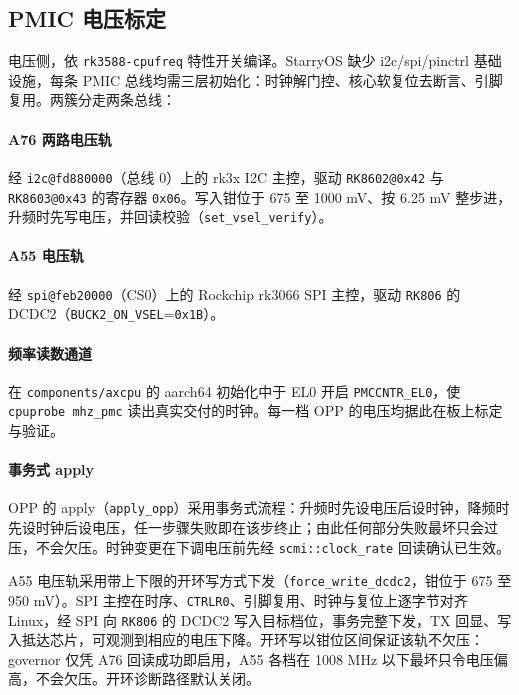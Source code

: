 \subsection{PMIC 电压标定}

电压侧，依 \texttt{rk3588-cpufreq} 特性开关编译。StarryOS 缺少 i2c/spi/pinctrl 基础设施，每条 PMIC 总线均需三层初始化：时钟解门控、核心软复位去断言、引脚复用。两簇分走两条总线：

\paragraph{A76 两路电压轨}
经 \texttt{i2c@fd880000}（总线 0）上的 rk3x I2C 主控，驱动 \texttt{RK8602@0x42} 与 \texttt{RK8603@0x43} 的寄存器 \texttt{0x06}。写入钳位于 675 至 1000 mV、按 6.25 mV 整步进，升频时先写电压，并回读校验（\texttt{set\_vsel\_verify}）。

\paragraph{A55 电压轨}
经 \texttt{spi@feb20000}（CS0）上的 Rockchip rk3066 SPI 主控，驱动 \texttt{RK806} 的 DCDC2（\texttt{BUCK2\_ON\_VSEL}=\texttt{0x1B}）。

\paragraph{频率读数通道}
在 \texttt{components/axcpu} 的 aarch64 初始化中于 EL0 开启 \texttt{PMCCNTR\_EL0}，使 \texttt{cpuprobe mhz\_pmc} 读出真实交付的时钟。每一档 OPP 的电压均据此在板上标定与验证。

\paragraph{事务式 apply}
OPP 的 apply（\texttt{apply\_opp}）采用事务式流程：升频时先设电压后设时钟，降频时先设时钟后设电压，任一步骤失败即在该步终止；由此任何部分失败最坏只会过压，不会欠压。时钟变更在下调电压前先经 \texttt{scmi::clock\_rate} 回读确认已生效。

A55 电压轨采用带上下限的开环写方式下发（\texttt{force\_write\_dcdc2}，钳位于 675 至 950 mV）。SPI 主控在时序、\texttt{CTRLR0}、引脚复用、时钟与复位上逐字节对齐 Linux，经 SPI 向 \texttt{RK806} 的 DCDC2 写入目标档位，事务完整下发，TX 回显、写入抵达芯片，可观测到相应的电压下降。开环写以钳位区间保证该轨不欠压：governor 仅凭 A76 回读成功即启用，A55 各档在 1008 MHz 以下最坏只令电压偏高，不会欠压。开环诊断路径默认关闭。

